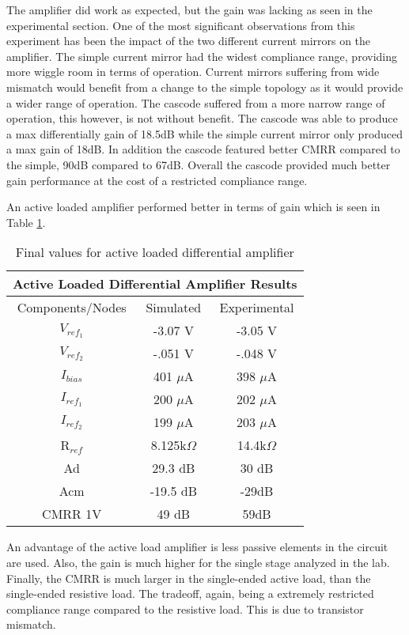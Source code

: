 The amplifier did work as expected, but the gain was lacking as seen in the experimental section. One of the most significant observations from this experiment has been the impact of the two different current mirrors on the amplifier. The simple current mirror had the widest compliance range, providing more wiggle room in terms of operation. Current mirrors suffering from wide mismatch would benefit from a change to the simple topology as it would provide a wider range of operation. The cascode suffered from a more narrow range of operation, this however, is not without benefit. The cascode was able to produce a max differentially gain of 18.5dB while the simple current mirror only produced a max gain of 18dB. In addition the cascode featured better CMRR compared to the simple, 90dB compared to 67dB. Overall the cascode provided much better gain performance at the cost of a restricted compliance range.


An active loaded amplifier performed better in terms of gain which is seen in Table \ref{tab:FinalActive}.

\begin{table}[H]
\centering
\caption{Final values for active loaded differential amplifier}
\label{tab:FinalActive}
\begin{tabular}{|c|c|c|}
\hline
\multicolumn{3}{|c|}{Active Loaded Differential Amplifier Results} \\ \hline
Components/Nodes          & Simulated          & Experimental          \\ \hline
$V_{ref_1}$               &  -3.07 V                  & -3.05 V                      \\ \hline
$V_{ref_2}$               &   -.051 V                 & -.048 V                       \\ \hline
$I_{bias}$                &     401 $\mu$A               &    398 $\mu$A                   \\ \hline
$I_{ref_1}$               & 200 $\mu$A                   &  202 $\mu$A                     \\ \hline
$I_{ref_2}$               & 199 $\mu$A                   &  203 $\mu$A                     \\ \hline
R$_{ref}$                 & 8.125k$\Omega$     & 14.4k$\Omega$  
\\ \hline
Ad                       & 29.3 dB             & 30 dB \\ \hline
Acm                      & -19.5 dB            & -29dB \\ \hline
CMRR 1V                   & 49 dB               & 59dB \\ \hline
\end{tabular}
\end{table}

An advantage of the active load amplifier is less passive elements in the circuit are used. Also, the gain is much higher for the single stage analyzed in the lab. Finally, the CMRR is much larger in the single-ended active load, than the single-ended resistive load. The tradeoff, again, being a extremely restricted compliance range compared to the resistive load. This is due to transistor mismatch.


